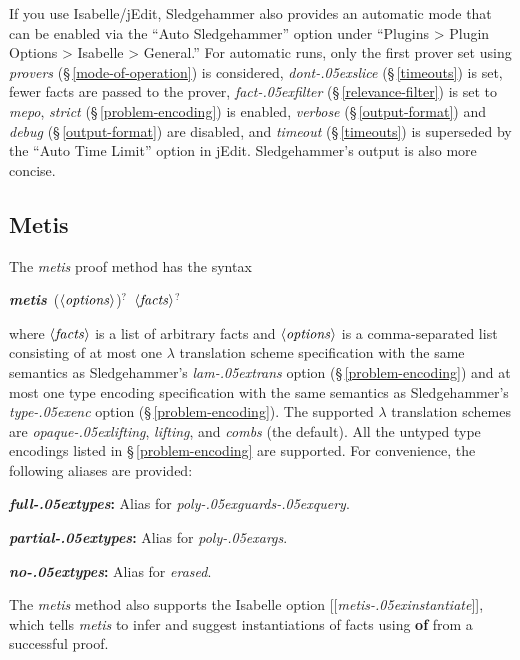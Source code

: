 \documentclass[a4paper,12pt]{article}
\let\oldS=\S
\def\S{\oldS\,}
\def\qty#1{\ensuremath{\left<\mathit{#1\/}\right>}}
\renewcommand\_{\hbox{\textunderscore\kern-.05ex}}
\begin{document}
If you use Isabelle/jEdit, Sledgehammer also provides an automatic mode that can
be enabled via the ``Auto Sledgehammer'' option under ``Plugins > Plugin Options
> Isabelle > General.'' For automatic runs, only the first prover set using
\textit{provers} (\S\ref{mode-of-operation}) is considered,
\textit{dont\_slice} (\S\ref{timeouts}) is set, fewer facts are
passed to the prover, \textit{fact\_filter} (\S\ref{relevance-filter}) is set to
\textit{mepo}, \textit{strict} (\S\ref{problem-encoding}) is enabled,
\textit{verbose} (\S\ref{output-format}) and \textit{debug}
(\S\ref{output-format}) are disabled, and \textit{timeout} (\S\ref{timeouts}) is
superseded by the ``Auto Time Limit'' option in jEdit. Sledgehammer's output is
also more concise.


\subsection{Metis}
\label{metis}

The \textit{metis} proof method has the syntax

\prew
\textbf{\textit{metis}}~(\qty{options})${}^?$~\qty{facts}${}^?$
\postw

where \qty{facts} is a list of arbitrary facts and \qty{options} is a
comma-separated list consisting of at most one $\lambda$ translation scheme
specification with the same semantics as Sledgehammer's \textit{lam\_trans}
option (\S\ref{problem-encoding}) and at most one type encoding specification
with the same semantics as Sledgehammer's \textit{type\_enc} option
(\S\ref{problem-encoding}).
%
The supported $\lambda$ translation schemes are \textit{opaque\_lifting},
\textit{lifting}, and \textit{combs} (the default).
%
All the untyped type encodings listed in \S\ref{problem-encoding} are supported.
For convenience, the following aliases are provided:
\begin{enum}
\item[\labelitemi] \textbf{\textit{full\_types}:} Alias for \textit{poly\_guards\_query}.
\item[\labelitemi] \textbf{\textit{partial\_types}:} Alias for \textit{poly\_args}.
\item[\labelitemi] \textbf{\textit{no\_types}:} Alias for \textit{erased}.
\end{enum}

The \textit{metis} method also supports the Isabelle option
[[\textit{metis\_instantiate}]], which tells \textit{metis} to infer and
suggest instantiations of facts using \textbf{of} from a successful proof.
\end{document}
